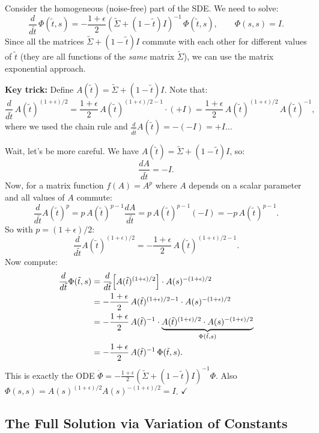 \documentclass[11pt, a4paper]{article}
\theoremstyle{definition}
\begin{document}
\begin{calculation}[title={Verifying that $\Phi$ solves the homogeneous equation}]
Consider the homogeneous (noise-free) part of the SDE. We need to solve:
\[
    \frac{d}{d\tilde{t}}\,\Phi({\tilde{t}},s) = -\frac{1+\epsilon}{2}(\tilde{\Sigma}+(1-\tilde{t})I)^{-1}\,\Phi({\tilde{t}},s), \qquad \Phi(s,s) = I.
\]
Since all the matrices $\tilde{\Sigma}+(1-\tilde{t})I$ commute with each other for different values of $\tilde{t}$ (they are all functions of the \emph{same} matrix $\tilde{\Sigma}$), we can use the matrix exponential approach.

\medskip
\textbf{Key trick:} Define $A(\tilde{t}) = \tilde{\Sigma}+(1-\tilde{t})I$. Note that:
\[
    \frac{d}{d\tilde{t}}\, A(\tilde{t})^{(1+\epsilon)/2} = \frac{1+\epsilon}{2}\,A(\tilde{t})^{(1+\epsilon)/2-1}\cdot(+I) = \frac{1+\epsilon}{2}\,A(\tilde{t})^{(1+\epsilon)/2}\, A(\tilde{t})^{-1},
\]
where we used the chain rule and $\frac{d}{d\tilde{t}}A(\tilde{t}) = -(-I) = +I$...

\medskip
Wait, let's be more careful. We have $A(\tilde{t}) = \tilde{\Sigma} + (1-\tilde{t})I$, so:
\[
    \frac{dA}{d\tilde{t}} = -I.
\]
Now, for a matrix function $f(A) = A^p$ where $A$ depends on a scalar parameter and all values of $A$ commute:
\[
    \frac{d}{d\tilde{t}} A(\tilde{t})^p = p\, A(\tilde{t})^{p-1}\frac{dA}{d\tilde{t}} = p\,A(\tilde{t})^{p-1}(-I) = -p\,A(\tilde{t})^{p-1}.
\]
So with $p = (1+\epsilon)/2$:
\[
    \frac{d}{d\tilde{t}} A(\tilde{t})^{(1+\epsilon)/2} = -\frac{1+\epsilon}{2}\,A(\tilde{t})^{(1+\epsilon)/2 - 1}.
\]
Now compute:
\begin{align}
    \frac{d}{d\tilde{t}}\Phi(\tilde{t},s) &= \frac{d}{d\tilde{t}}\Bigl[A(\tilde{t})^{(1+\epsilon)/2}\Bigr]\cdot A(s)^{-(1+\epsilon)/2} \notag \\
    &= -\frac{1+\epsilon}{2}\,A(\tilde{t})^{(1+\epsilon)/2-1}\cdot A(s)^{-(1+\epsilon)/2} \notag \\
    &= -\frac{1+\epsilon}{2}\,A(\tilde{t})^{-1}\cdot \underbrace{A(\tilde{t})^{(1+\epsilon)/2}\cdot A(s)^{-(1+\epsilon)/2}}_{\Phi(\tilde{t},s)} \notag \\
    &= -\frac{1+\epsilon}{2}\,A(\tilde{t})^{-1}\,\Phi(\tilde{t},s). \notag
\end{align}
This is exactly the ODE $\dot{\Phi} = -\frac{1+\epsilon}{2}(\tilde{\Sigma}+(1-\tilde{t})I)^{-1}\Phi$. Also $\Phi(s,s) = A(s)^{(1+\epsilon)/2}A(s)^{-(1+\epsilon)/2} = I$. $\checkmark$
\end{calculation}

\subsection{The Full Solution via Variation of Constants}
\end{document}
